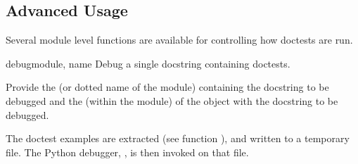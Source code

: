 

\subsection{Advanced Usage}

Several module level functions are available for controlling how doctests
are run.

\begin{funcdesc}{debug}{module, name}
  Debug a single docstring containing doctests.

  Provide the  (or dotted name of the module) containing the
  docstring to be debugged and the  (within the module) of the
  object with the docstring to be debugged.

  The doctest examples are extracted (see function ),
  and written to a temporary file.  The Python debugger, ,
  is then invoked on that file.
\end{funcdesc}

